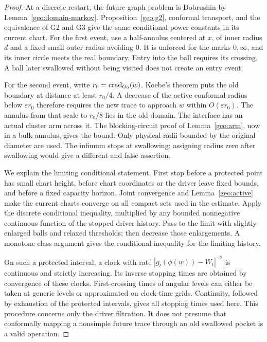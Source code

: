\begin{proof}
At a discrete restart, the future graph problem is Dobrushin by
Lemma~\ref{geo:domain-markov}. Proposition~\ref{geo:g2}, conformal
transport, and the equivalence of G2 and G3 give the same conditional
power constants in its current chart. For the first event, use a
half-annulus centered at \(x\), of inner radius \(d\) and a fixed small
outer radius avoiding \(0\). It is unforced for the marks \(0,\infty\),
and its inner circle meets the real boundary. Entry into the ball
requires its crossing. A ball later swallowed without being visited
does not create an entry event.

For the second event, write \(r_0=\operatorname{crad}_{O_0}(w)\).
Koebe's theorem puts the old boundary at distance at least \(r_0/4\).
A decrease of the active conformal radius below \(\varepsilon r_0\)
therefore requires the new trace to approach \(w\) within
\(O(\varepsilon r_0)\). The annulus from that scale to \(r_0/8\) lies
in the old domain. The interface has an actual cluster arm across
it. The blocking-circuit proof of Lemma~\ref{geo:arm}, now in a bulk
annulus, gives the bound. Only physical radii bounded by the original
diameter are used. The infimum stops at swallowing; assigning radius
zero after swallowing would give a different and false assertion.

We explain the limiting conditional statement. First stop before
a protected point has small chart height, before chart coordinates
or the driver leave fixed bounds, and before a fixed capacity
horizon. Joint convergence and Lemma~\ref{geo:active} make the
current charts converge on all compact sets used in the estimate.
Apply the discrete conditional inequality, multiplied by any
bounded nonnegative continuous function of the stopped driver
history. Pass to the limit with slightly enlarged balls and relaxed
thresholds; then decrease those enlargements. A monotone-class
argument gives the conditional inequality for the limiting history.

On such a protected interval, a clock with rate
\(|g_t(\phi(w))-W_t|^{-2}\) is continuous and strictly increasing.
Its inverse stopping times are obtained by convergence of these
clocks. First-crossing times of angular levels can either be taken
at generic levels or approximated on clock-time grids. Continuity,
followed by exhaustion of the protected intervals, gives all
stopping times used here. This procedure concerns only the driver
filtration. It does not presume that conformally mapping a
nonsimple future trace through an old swallowed pocket is a valid
operation.
\end{proof}

